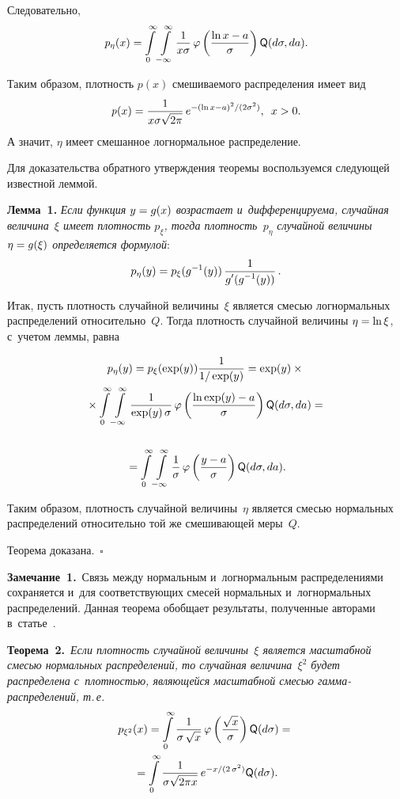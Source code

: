 \begin{multicols}{2}
Следовательно,
$$
\mathit{p}_\eta(x) = \int\limits_{0}^{\infty}  \int\limits_{-\infty}^{\infty} \displaystyle\frac{\displaystyle 1\mathstrut}{\displaystyle x \sigma\mathstrut} \,
\varphi\left(\displaystyle\frac{\displaystyle \ln x-a\mathstrut}{\displaystyle \sigma\mathstrut} \right) {\sf Q} (d\sigma, da).
$$

Таким образом, плотность $\mathit{p}(x)$ смешиваемого распределения имеет вид
$$
\mathit{p}(x) = \displaystyle\frac{\displaystyle 1\mathstrut}{\displaystyle x\sigma\sqrt{2\pi}\mathstrut}\,e^{-{(\ln x - a)^2}/({2\sigma^2})}, \enskip x>0.
$$
А значит, $\eta$ имеет смешанное логнормальное распределение.

Для доказательства обратного утверждения теоремы воспользуемся следующей известной леммой.

\noindent
\textbf{Лемма~1.}
\textit{Если функция $y\hm=g(x)$ возрастает и~дифференцируема, случайная величина~$\xi$ имеет 
плотность $p_\xi$, тогда плотность~$p_\eta$ случайной 
величины $\eta\hm=g(\xi)$ определяется формулой}:
$$
p_\eta(y)=p_\xi(g^{-1}(y))\, \displaystyle\frac{\displaystyle 1\mathstrut}{\displaystyle g'(g^{-1}(y))\mathstrut}\,.
$$



Итак, пусть плотность случайной величины~$\xi$ является смесью логнормальных распределений относительно~$Q$.
Тогда плотность случайной величины $\eta\hm=\ln\xi$, с~учетом леммы, равна

\noindent
\begin{multline*}
p_\eta(y)=p_\xi(\exp(y)) \displaystyle\frac{\displaystyle 1\mathstrut}{\displaystyle 1/\exp(y)\mathstrut}=
\exp(y)\times{}\\
{}\times \int\limits_{0}^{\infty}  \int\limits_{-\infty}^{\infty} \displaystyle\frac{\displaystyle 1\mathstrut}{\displaystyle \exp(y)\, \sigma\mathstrut} \,
\varphi \left(\displaystyle\frac{\displaystyle \ln \exp(y)-a\mathstrut}{\displaystyle \sigma\mathstrut} \right) {\sf Q} (d\sigma, da)={}\\
\\
{}=\int\limits_{0}^{\infty}  \int\limits_{-\infty}^{\infty} \displaystyle\frac{\displaystyle 1\mathstrut}{\displaystyle \sigma\mathstrut} \,
\varphi \left(\displaystyle\frac{\displaystyle y-a\mathstrut}{\displaystyle \sigma\mathstrut} \right) 
{\sf Q} (d\sigma, da).
\end{multline*}

Таким образом, плотность случайной величины~$\eta$ является смесью 
нормальных распределений относительно той же смешивающей меры~$Q$.


Теорема доказана.~\hfill$\square$

\smallskip

\noindent
\textbf{Замечание~1.}\ 
Связь между нормальным и~логнормальным распределениями сохраняется и~для соответствующих 
смесей нормальных и~логнормальных распределений. Данная теорема обобщает результаты, 
полученные авторами в~статье~\cite{simple_mix}.


\smallskip

\noindent
\textbf{Теорема~2.}\
\textit{Если плотность случайной величины~$\xi$ является масштабной смесью нормальных распределений,
то случайная величина~$\xi^2$ будет распределена с~плотностью, являющейся масштабной смесью 
гам\-ма-рас\-пре\-де\-ле\-ний, т.\,е.}
\begin{multline*}
{p}_{\xi^2}(x) =  \int\limits_{0}^{\infty}  \displaystyle\frac{\displaystyle 1\mathstrut}{\displaystyle \sigma \, \sqrt{x}\mathstrut} \, 
\varphi\left(\displaystyle\frac{\displaystyle \sqrt{x}\mathstrut}{\displaystyle \sigma\mathstrut}\right) {\sf Q} (d\sigma)= {}\\
{}=\int\limits_{0}^{\infty}  \displaystyle\frac{\displaystyle 1\mathstrut}{\displaystyle \sigma  \sqrt{2 \pi x }\mathstrut} \,   e^{-{x}/({2 \, \sigma^2})} {\sf Q} (d\sigma).
\end{multline*}



\end{multicols}

